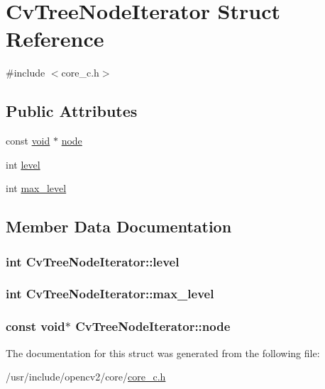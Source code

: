 \hypertarget{structCvTreeNodeIterator}{\section{Cv\-Tree\-Node\-Iterator Struct Reference}
\label{structCvTreeNodeIterator}
}


{\ttfamily \#include $<$core\-\_\-c.\-h$>$}

\subsection*{Public Attributes}
\begin{DoxyCompactItemize}
\item 
const \hyperlink{legacy_8hpp_a8bb47f092d473522721002c86c13b94e}{void} $\ast$ \hyperlink{structCvTreeNodeIterator_af810f94b77fddbb5345d59afa3c536e6}{node}
\item 
int \hyperlink{structCvTreeNodeIterator_a2e15a5c9c012f972d1af74f020d31d65}{level}
\item 
int \hyperlink{structCvTreeNodeIterator_a7a4807026019e6033b3c210500b53c29}{max\-\_\-level}
\end{DoxyCompactItemize}


\subsection{Member Data Documentation}
\hypertarget{structCvTreeNodeIterator_a2e15a5c9c012f972d1af74f020d31d65}{
\subsubsection[{level}]{\setlength{\rightskip}{0pt plus 5cm}int Cv\-Tree\-Node\-Iterator\-::level}}\label{structCvTreeNodeIterator_a2e15a5c9c012f972d1af74f020d31d65}
\hypertarget{structCvTreeNodeIterator_a7a4807026019e6033b3c210500b53c29}{
\subsubsection[{max\-\_\-level}]{\setlength{\rightskip}{0pt plus 5cm}int Cv\-Tree\-Node\-Iterator\-::max\-\_\-level}}\label{structCvTreeNodeIterator_a7a4807026019e6033b3c210500b53c29}
\hypertarget{structCvTreeNodeIterator_af810f94b77fddbb5345d59afa3c536e6}{
\subsubsection[{node}]{\setlength{\rightskip}{0pt plus 5cm}const {\bf void}$\ast$ Cv\-Tree\-Node\-Iterator\-::node}}\label{structCvTreeNodeIterator_af810f94b77fddbb5345d59afa3c536e6}


The documentation for this struct was generated from the following file\-:\begin{DoxyCompactItemize}
\item 
/usr/include/opencv2/core/\hyperlink{core__c_8h}{core\-\_\-c.\-h}\end{DoxyCompactItemize}
